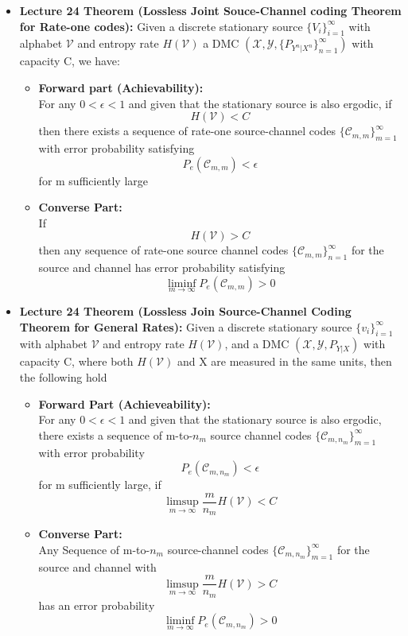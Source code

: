 \documentclass{article}
\begin{document}
\begin{itemize}
    \item \textbf{Lecture 24 Theorem (Lossless Joint Souce-Channel coding Theorem for Rate-one codes):}
    Given a discrete stationary source \(\{V_i\}_{i=1}^\infty\) with alphabet \(\mathcal{V}\) and entropy rate \(H(\mathcal{V})\) a DMC \((\mathcal{X}, \mathcal{Y}, \{P_{Y^n|X^n}\}_{n=1}^\infty)\) with capacity C, we have:
    \begin{itemize}
        \item \textbf{Forward part (Achievability):} \\
        For any \(0< \epsilon < 1\) and given that the stationary source is also ergodic, if
        \[H(\mathcal{V})<C\]
        then there exists a sequence of rate-one source-channel codes \(\{\mathcal{C}_{m,m}\}_{m=1}^\infty\) with error probability satisfying
        \[P_e(\mathcal{C}_{m,m})<\epsilon\]
        for m sufficiently large
        \item \textbf{Converse Part:} \\
        If 
        \[H(\mathcal{V})>C\]
        then any sequence of rate-one source channel codes \(\{\mathcal{C}_{m,m}\}_{n=1}^\infty\) for the source and channel has error probability satisfying
        \[\liminf_{m \to \infty} P_e(\mathcal{C}_{m,m})>0\]
    \end{itemize}

    \item \textbf{Lecture 24 Theorem (Lossless Join Source-Channel Coding Theorem for General Rates):} 
    Given a discrete stationary source \(\{v_i\}_{i=1}^\infty\) with alphabet \(\mathcal{V}\) and entropy rate \(H(\mathcal{V})\), and a DMC \((\mathcal{X}, \mathcal{Y}, P_{Y|X})\) with capacity C, where
    both \(H(\mathcal{V})\) and X are measured in the same units, then the following hold
    \begin{itemize}
        \item \textbf{Forward Part (Achieveability):} \\
        For any \(0<\epsilon<1\) and given that the stationary source is also ergodic, there exists a sequence of m-to-\(n_m\) source channel codes \(\{\mathcal{C}_{m, n_m}\}_{m=1}^\infty\) with error probability
        \[P_e(\mathcal{C}_{m,n_m})<\epsilon\]
        for m sufficiently large, if
        \[\limsup_{m \to \infty} \frac{m}{n_m}H(\mathcal{V})<C\]
        \item \textbf{Converse Part:} \\
        Any Sequence of m-to-\(n_m\) source-channel codes \(\{\mathcal{C}_{m, n_m}\}_{m=1}^\infty\) for the source and channel with
        \[\limsup_{m \to \infty}\frac{m}{n_m}H(\mathcal{V})>C\]
        has an error probability
        \[\liminf_{m \to \infty} P_e(\mathcal{C}_{m,n_m})>0\]
    \end{itemize}
\end{itemize}
\end{document}
